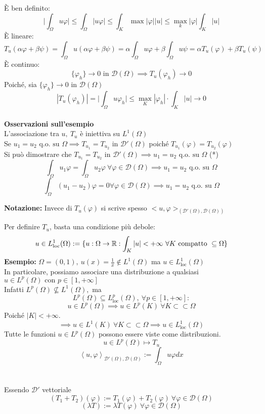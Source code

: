 È ben definito:
\[\bigg| \int_{\Omega}^{} u\varphi\bigg|\le \int_{\Omega}^{} |u\varphi|\le \int_{K}^{} \max |\varphi | |u|\le \max_k|\varphi|\int_{K}^{} |u|  \]  
È lineare:
\[T_u(\alpha\varphi+\beta\psi)=\int_{\Omega}^{} u(\alpha\varphi+\beta\psi)=\alpha \int_{\Omega}^{} u\varphi +\beta \int_{\Omega}^{}u\psi =\alpha T_u(\varphi)+\beta T_u(\psi)   \]
È continuo:
\[\{\varphi_h\} \to 0\text{ in }\mathcal D(\Omega)\implies T_u(\varphi_h)\to 0\]
Poiché, sia $\{\varphi_h\} \to 0\text{ in }\mathcal D(\Omega)$
\[|T_u(\varphi_h)|=\bigg|\int_{\Omega}^{} u\varphi_h \bigg|\le \max_K|\varphi_h|\cdot \int_{K}^{} |u|\to 0\]  
\\\textbf{Osservazioni sull'esempio} 
\\L'associazione tra $u,\ T_u$ è iniettiva su $L^{1}(\Omega)$
\\Se $u_1=u_2\text{ q.o. su }\Omega\implies T_{u_1}=T_{u_2}\text{ in }\mathcal D'(\Omega)$ poiché $T_{u_1}(\varphi)=T_{u_2}(\varphi)$
\\Si può dimostrare che $T_{u_1}=T_{u_2}\text{ in }\mathcal D'(\Omega)\implies u_1=u_2 \text{ q.o. su }\Omega$ (*)
\[\int_{\Omega}^{} u_1\varphi = \int_{\Omega}^{} u_2\varphi\ \forall \varphi\in \mathcal D(\Omega)\implies u_1=u_2\text{ q.o. su } \Omega\] 
\[\int_{\Omega}^{} (u_1-u_2)\varphi =0 \forall \varphi\in \mathcal D(\Omega)\implies u_1=u_2\text{ q.o. su } \Omega\] 
\divider
\begin{tcolorbox}
\textbf{Notazione:} Invece di $T_u(\varphi)$ si scrive spesso $<u,\varphi>_{(\mathcal D'(\Omega), \mathcal D(\Omega))}$
\end{tcolorbox}
Per definire $T_u$, basta una condizione più debole:
\[u\in L^1_{\text{loc}}(\Omega):=\{u:\Omega\to \R: \int_{K}^{} |u|<+\infty\ \forall K\text{ compatto }\subseteq  \Omega \}\]
\textbf{Esempio:} $\Omega=(0,1),\ u(x)=\frac{1}{x}\not\in L^1(\Omega)$ ma $u\in L^1_{\text{loc}}(\Omega)$
\\In particolare, possiamo associare una distribuzione a qualsiasi $u\in L^{p}(\Omega)\text{ con } p \in [1,+\infty]$ 
\\Infatti $L^{p}(\Omega)\not \subseteq  L^1(\Omega), $ ma 
\[L^{p}(\Omega)\subseteq  L^p_{\text{loc}}(\Omega),\ \forall  p \in [1,+\infty]:\]
\[u\in L^{p}(\Omega)\implies u\in L^{p}(K)\ \forall K \subset \subset \Omega\]
Poiché $|K|<+\infty$.
\[\implies u \in L^{1}(K)\ \forall K \subset  \subset \Omega \implies u\in L_{\text{loc}}^1(\Omega)\]
Tutte le funzioni $u\in L^{p}(\Omega)$ possono essere viste come distribuzioni.
\[u\in L^{p}(\Omega)\mapsto T_u\]
\[\left<u,\varphi \right>_{\mathcal D'(\Omega), \mathcal D(\Omega)}:=\int_{\Omega}^{} u\varphi dx\]
\divider\\
\\Essendo $\mathcal D'$ vettoriale
\[(T_1+T_2)(\varphi):=T_1(\varphi)+T_2(\varphi)\ \forall \varphi\in \mathcal D(\Omega)\]
\[(\lambda T):=\lambda T(\varphi) \ \forall \varphi \in \mathcal D(\Omega)\]
